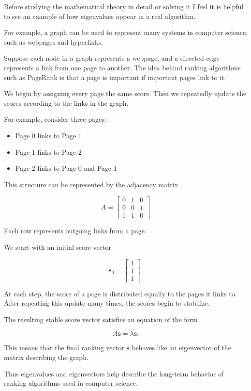 \documentclass{article}
\begin{document}
Before studying the mathematical theory in detail or solving it I feel it is helpful to
see an example of how eigenvalues appear in a real algorithm.


For example, a graph can be used to represent many systems in computer science,
such as webpages and hyperlinks.

Suppose each node in a graph represents a webpage, and a directed edge
represents a link from one page to another. The idea behind ranking
algorithms such as PageRank is that a page is important if important
pages link to it.

We begin by assigning every page the same score. Then we repeatedly
update the scores according to the links in the graph.

For example, consider three pages:

\begin{itemize}
\item Page $0$ links to Page $1$
\item Page $1$ links to Page $2$
\item Page $2$ links to Page $0$ and Page $1$
\end{itemize}

This structure can be represented by the adjacency matrix

\[
A =
\begin{bmatrix}
0 & 1 & 0 \\
0 & 0 & 1 \\
1 & 1 & 0
\end{bmatrix}
\]

Each row represents outgoing links from a page.

We start with an initial score vector

\[
\mathbf{s}_0 =
\begin{bmatrix}
1 \\
1 \\
1
\end{bmatrix}.
\]

At each step, the score of a page is distributed equally to the
pages it links to. After repeating this update many times, the
scores begin to stabilize.

The resulting stable score vector satisfies an equation of the form

\[
A\mathbf{s} = \lambda \mathbf{s}.
\]

This means that the final ranking vector $\mathbf{s}$ behaves like
an eigenvector of the matrix describing the graph.

Thus eigenvalues and eigenvectors help describe the long-term behavior
of ranking algorithms used in computer science.
\end{document}
